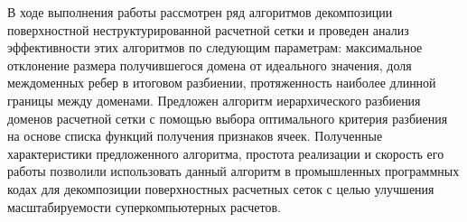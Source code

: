 В ходе выполнения работы рассмотрен ряд алгоритмов декомпозиции поверхностной неструктурированной расчетной сетки и проведен анализ эффективности этих алгоритмов по следующим параметрам: максимальное отклонение размера получившегося домена от идеального значения, доля междоменных ребер в итоговом разбиении, протяженность наиболее длинной границы между доменами.
Предложен алгоритм иерархического разбиения доменов расчетной сетки с помощью выбора оптимального критерия разбиения на основе списка функций получения признаков ячеек.
Полученные характеристики предложенного алгоритма, простота реализации и скорость его работы позволили использовать данный алгоритм в промышленных программных кодах для декомпозиции поверхностных расчетных сеток с целью улучшения масштабируемости суперкомпьютерных расчетов.
